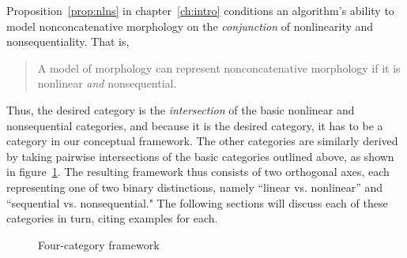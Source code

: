 Proposition~\ref{prop:nlns} in chapter~\ref{ch:intro} conditions an algorithm's ability to model nonconcatenative morphology on the \emph{conjunction} of nonlinearity and nonsequentiality. That is, 
\begin{quote}\noindent
A model of morphology can represent nonconcatenative morphology if it is nonlinear \emph{and} nonsequential.
\end{quote}
Thus, the desired category is the \emph{intersection} of the basic nonlinear and nonsequential categories, and because it is the desired category, it has to be a category in our conceptual framework.
The other categories are similarly derived by taking pairwise intersections of the basic categories outlined above, as shown in figure~\ref{fig:intersections}.
The resulting framework thus consists of two orthogonal axes, each representing one of two binary distinctions,
namely ``linear vs. nonlinear'' and ``sequential vs. nonsequential." The following sections will discuss each of these categories
in turn, citing examples 
for each. 
\begin{figure}[!h]
\centering
{}
\label{fig:intersections}
\caption{Four-category framework}
\end{figure}
 

